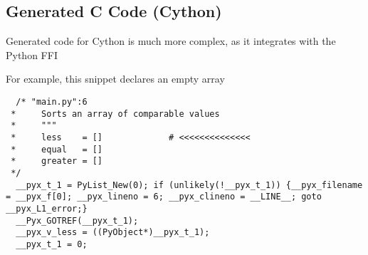 \documentclass{article}
\begin{document}
\newpage
\subsection{Generated C Code (Cython)}

Generated code for Cython is much more complex, as it integrates with the Python FFI

For example, this snippet declares an empty array

\begin{lstlisting}
  /* "main.py":6
 *     Sorts an array of comparable values
 *     """
 *     less    = []             # <<<<<<<<<<<<<<
 *     equal   = []
 *     greater = []
 */
  __pyx_t_1 = PyList_New(0); if (unlikely(!__pyx_t_1)) {__pyx_filename = __pyx_f[0]; __pyx_lineno = 6; __pyx_clineno = __LINE__; goto __pyx_L1_error;}
  __Pyx_GOTREF(__pyx_t_1);
  __pyx_v_less = ((PyObject*)__pyx_t_1);
  __pyx_t_1 = 0;
\end{lstlisting}

\newpage
\end{document}
